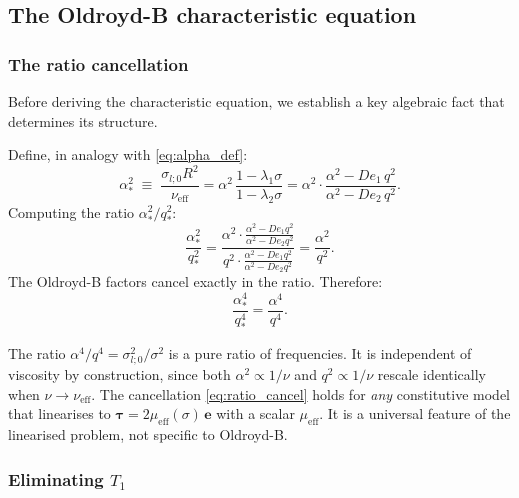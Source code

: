 \subsection{The Oldroyd-B characteristic equation}

\subsubsection{The ratio cancellation}

Before deriving the characteristic equation, we establish a key algebraic
fact that determines its structure.

\begin{derivbox}
Define, in analogy with \eqref{eq:alpha_def}:
\begin{equation}
  \alpha_*^2 \;\equiv\; \frac{\sigma_{l;0}R^2}{\nu_{\mathrm{eff}}}
  = \alpha^2\,\frac{1-\lambda_1\sigma}{1-\lambda_2\sigma}
  = \alpha^2\cdot\frac{\alpha^2-De_1\,q^2}{\alpha^2-De_2\,q^2}.
  \label{eq:alphastar_OB}
\end{equation}
Computing the ratio $\alpha_*^2/q_*^2$:
\[
  \frac{\alpha_*^2}{q_*^2}
  = \frac{\displaystyle\alpha^2\cdot\frac{\alpha^2-De_1 q^2}{\alpha^2-De_2 q^2}}
         {\displaystyle q^2\cdot\frac{\alpha^2-De_1 q^2}{\alpha^2-De_2 q^2}}
  = \frac{\alpha^2}{q^2}.
\]
The Oldroyd-B factors cancel exactly in the ratio. Therefore:
\begin{equation}
  \frac{\alpha_*^4}{q_*^4} = \frac{\alpha^4}{q^4}.
  \label{eq:ratio_cancel}
\end{equation}
\end{derivbox}

\begin{notebox}
The ratio $\alpha^4/q^4 = \sigma_{l;0}^2/\sigma^2$ is a pure ratio of
frequencies. It is independent of viscosity by construction, since both
$\alpha^2 \propto 1/\nu$ and $q^2 \propto 1/\nu$ rescale identically when
$\nu \to \nu_{\mathrm{eff}}$. The cancellation \eqref{eq:ratio_cancel} holds
for \emph{any} constitutive model that linearises to $\boldsymbol{\tau} =
2\mu_{\mathrm{eff}}(\sigma)\,\mathbf{e}$ with a scalar $\mu_{\mathrm{eff}}$.
It is a universal feature of the linearised problem, not specific to
Oldroyd-B.
\end{notebox}

\subsubsection{Eliminating $T_1$}

